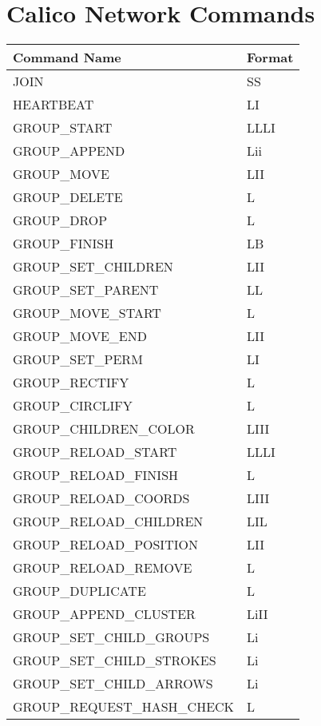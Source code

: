 
\section{Calico Network Commands}
\begin{table}[h]
  \begin{tabular}{ | l | l | }
  \hline
  \textbf{Command Name} & \textbf{Format} \\ 
  \hline
  JOIN & SS \\
  \hline
  HEARTBEAT & LI \\
  \hline
  GROUP\_START & LLLI \\
  \hline
  GROUP\_APPEND & Lii \\
  \hline
  GROUP\_MOVE & LII \\
  \hline
  GROUP\_DELETE & L \\
  \hline
  GROUP\_DROP & L \\
  \hline
  GROUP\_FINISH & LB \\
  \hline
  GROUP\_SET\_CHILDREN & LII \\
  \hline
  GROUP\_SET\_PARENT & LL \\
  \hline
  GROUP\_MOVE\_START & L \\
  \hline
  GROUP\_MOVE\_END & LII \\
  \hline
  GROUP\_SET\_PERM & LI \\
  \hline
  GROUP\_RECTIFY & L \\
  \hline
  GROUP\_CIRCLIFY & L \\
  \hline
  GROUP\_CHILDREN\_COLOR & LIII \\
  \hline
  GROUP\_RELOAD\_START & LLLI \\
  \hline
  GROUP\_RELOAD\_FINISH & L \\
  \hline
  GROUP\_RELOAD\_COORDS & LIII \\
  \hline
  GROUP\_RELOAD\_CHILDREN & LIL \\
  \hline
  GROUP\_RELOAD\_POSITION & LII \\
  \hline
  GROUP\_RELOAD\_REMOVE & L \\
  \hline
  GROUP\_DUPLICATE & L \\
  \hline
  GROUP\_APPEND\_CLUSTER & LiII \\
  \hline
  GROUP\_SET\_CHILD\_GROUPS & Li \\
  \hline
  GROUP\_SET\_CHILD\_STROKES & Li \\
  \hline
  GROUP\_SET\_CHILD\_ARROWS & Li \\
  \hline
  GROUP\_REQUEST\_HASH\_CHECK & L \\

\end{tabular}
\end{table}

